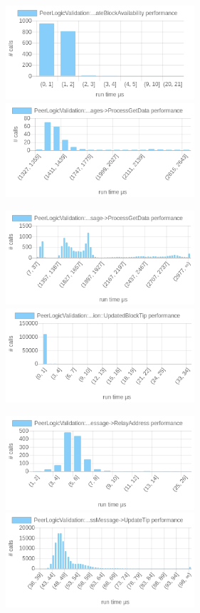 \documentclass{article}
\begin{document}
\includegraphics[width=7cm]{images/mumbai/chartPeerLogicValidation_3A_3AProcessMessages-_3EProcessMessage-_3EUpdateBlockAvailability.png}
\includegraphics[width=7cm]{images/mumbai/chartPeerLogicValidation_3A_3AProcessMessages-_3EProcessGetData.png}

\includegraphics[width=7cm]{images/mumbai/chartPeerLogicValidation_3A_3AProcessMessages-_3EProcessMessage-_3EProcessGetData.png}
\includegraphics[width=7cm]{images/mumbai/chartPeerLogicValidation_3A_3AProcessMessages-_3EProcessMessage-_3EPeerLogicValidation_3A_3AUpdatedBlockTip.png}

\includegraphics[width=7cm]{images/mumbai/chartPeerLogicValidation_3A_3AProcessMessages-_3EProcessMessage-_3ERelayAddress.png}
\includegraphics[width=7cm]{images/mumbai/chartPeerLogicValidation_3A_3AProcessMessages-_3EProcessMessage-_3EUpdateTip.png}
\end{document}
